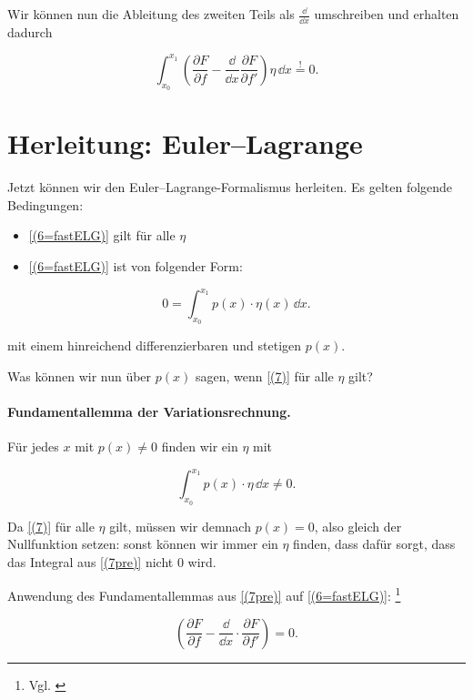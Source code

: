 Wir können nun die Ableitung des zweiten Teils als $\frac{\dd}{\dd x}$ umschreiben und erhalten dadurch

\begin{equation}\label{(6=fastELG)}
 \int_{x_0}^{x_1}\left(\frac{\partial F}{\partial f}-\frac{\dd}{\dd x}\frac{\partial F}{\partial f'}\right)\eta \,\dd x \overset{!}{=} 0.
\end{equation}

\section{Herleitung: Euler--Lagrange}
Jetzt können wir den Euler--Lagrange-Formalismus herleiten.
Es gelten folgende Bedingungen: 

\begin{itemize}
 \item \ref{(6=fastELG)} gilt für alle $\eta$
 \item \ref{(6=fastELG)} ist von folgender Form:
\end{itemize}

\begin{equation}\label{(7)}
 0=\int_{x_0}^{x_1} p(x) \cdot \eta(x) \,\dd x.
\end{equation}

mit einem hinreichend differenzierbaren und stetigen $p(x)$.

Was können wir nun über $p(x)$ sagen, wenn \ref{(7)} für alle $\eta$ gilt?

\paragraph{\textbf{Fundamentallemma der Variationsrechnung.}}\label{fundamentallemma}

Für jedes $x$ mit $p(x) \neq 0$ finden wir ein $\eta$ mit

\begin{equation}\label{(7pre)}
 \int_{x_0}^{x_1} p(x) \cdot \eta \,\dd x \neq 0.
\end{equation}

Da \ref{(7)} für alle $\eta$ gilt, müssen wir demnach $p(x)=0$, also gleich der Nullfunktion setzen:
sonst können wir immer ein $\eta$ finden, dass dafür sorgt, dass das Integral aus \ref{(7pre)} nicht $0$ wird. 

Anwendung des Fundamentallemmas aus \ref{(7pre)} auf \ref{(6=fastELG)}: \footnote{Vgl. \cite{weihnachtsübung}}

\begin{equation}\label{(8=ELG)}
 \left(\frac{\partial F}{\partial f}-\frac{\dd}{\dd x} \cdot 
 \frac{\partial F}{\partial f'}\right)=0.
\end{equation}

